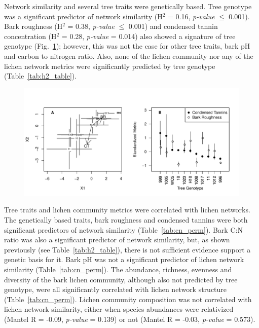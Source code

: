 \documentclass[11pt,twocolumn,twoside,lineno]{pnas-new}
\begin{document}
Network similarity and several tree traits were genetically
based. Tree genotype was a significant predictor of network similarity
(H$^2$ = 0.16, \textit{p-value} $\leq$ 0.001). Bark roughness (H$^2$ =
0.38, \textit{p-value} $\leq$ 0.001) and condensed tannin
concentration (H$^2$ = 0.28, \textit{p-value} = 0.014) also showed a
signature of tree genotype (Fig.~\ref{fig:h2_plot}); however, this was
not the case for other tree traits, bark pH and carbon to nitrogen
ratio. Also, none of the lichen community nor any of the lichen
network metrics were significantly predicted by tree genotype
(Table~\ref{tab:h2_table}).



\begin{figure}[ht]
\centering
\includegraphics[width=\linewidth]{h2_plot.pdf}
\caption{}
\label{fig:h2_plot}
\end{figure}


Tree traits and lichen community metrics were correlated with lichen
networks. The genetically based traits, bark roughness and condensed
tannins were both significant predictors of network similarity
(Table~\ref{tab:cn_perm}). Bark C:N ratio was also a significant
predictor of network similarity, but, as shown previously (see
Table~\ref{tab:h2_table}), there is not sufficient evidence support a
genetic basis for it. Bark pH was not a significant predictor of
lichen network similarity (Table~\ref{tab:cn_perm}). The abundance,
richness, evenness and diversity of the bark lichen community,
although also not predicted by tree genotype, were all significantly
correlated with lichen network structure
(Table~\ref{tab:cn_perm}). Lichen community composition was not
correlated with lichen network similarity, either when species
abundances were relativized (Mantel R = -0.09, \textit{p-value} =
0.139) or not (Mantel R = -0.03, \textit{p-value} = 0.573).
\end{document}
